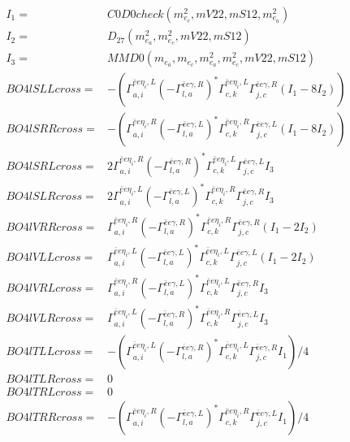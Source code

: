 \documentclass[A4,landscape]{article}
\begin{document}
\begin{align} 
I_1 = & C0D0check(m^2_{e_{{c}}}, mV22, mS12, m^2_{e_{{a}}}) \\ 
I_2 = & D_{27}(m^2_{e_{{a}}}, m^2_{e_{{c}}}, mV22, mS12) \\ 
I_3 = & MMD0(m_{e_{{a}}}, m_{e_{{c}}}, m^2_{e_{{a}}}, m^2_{e_{{c}}}, mV22, mS12) \\ 
  BO4lSLLcross= & -( \Gamma^{\bar{e}e \eta_i ,L}_{a, i} (- \Gamma^{\bar{e}e \gamma ,R} _{l, a})^* \Gamma^{\bar{e}e \eta_i ,L}_{c, k} \Gamma^{\bar{e}e \gamma ,R}_{j, c} (I_1 - 8 I_2)) \\ 
  BO4lSRRcross= & -( \Gamma^{\bar{e}e \eta_i ,R}_{a, i} (- \Gamma^{\bar{e}e \gamma ,L} _{l, a})^* \Gamma^{\bar{e}e \eta_i ,R}_{c, k} \Gamma^{\bar{e}e \gamma ,L}_{j, c} (I_1 - 8 I_2)) \\ 
  BO4lSRLcross= & 2  \Gamma^{\bar{e}e \eta_i ,R}_{a, i} (- \Gamma^{\bar{e}e \gamma ,R} _{l, a})^* \Gamma^{\bar{e}e \eta_i ,L}_{c, k} \Gamma^{\bar{e}e \gamma ,L}_{j, c} I_3 \\ 
  BO4lSLRcross= & 2  \Gamma^{\bar{e}e \eta_i ,L}_{a, i} (- \Gamma^{\bar{e}e \gamma ,L} _{l, a})^* \Gamma^{\bar{e}e \eta_i ,R}_{c, k} \Gamma^{\bar{e}e \gamma ,R}_{j, c} I_3 \\ 
  BO4lVRRcross= &  \Gamma^{\bar{e}e \eta_i ,R}_{a, i} (- \Gamma^{\bar{e}e \gamma ,R} _{l, a})^* \Gamma^{\bar{e}e \eta_i ,R}_{c, k} \Gamma^{\bar{e}e \gamma ,R}_{j, c} (I_1 - 2 I_2) \\ 
  BO4lVLLcross= &  \Gamma^{\bar{e}e \eta_i ,L}_{a, i} (- \Gamma^{\bar{e}e \gamma ,L} _{l, a})^* \Gamma^{\bar{e}e \eta_i ,L}_{c, k} \Gamma^{\bar{e}e \gamma ,L}_{j, c} (I_1 - 2 I_2) \\ 
  BO4lVRLcross= &  \Gamma^{\bar{e}e \eta_i ,R}_{a, i} (- \Gamma^{\bar{e}e \gamma ,L} _{l, a})^* \Gamma^{\bar{e}e \eta_i ,L}_{c, k} \Gamma^{\bar{e}e \gamma ,R}_{j, c} I_3 \\ 
  BO4lVLRcross= &  \Gamma^{\bar{e}e \eta_i ,L}_{a, i} (- \Gamma^{\bar{e}e \gamma ,R} _{l, a})^* \Gamma^{\bar{e}e \eta_i ,R}_{c, k} \Gamma^{\bar{e}e \gamma ,L}_{j, c} I_3 \\ 
  BO4lTLLcross= & -( \Gamma^{\bar{e}e \eta_i ,L}_{a, i} (- \Gamma^{\bar{e}e \gamma ,R} _{l, a})^* \Gamma^{\bar{e}e \eta_i ,L}_{c, k} \Gamma^{\bar{e}e \gamma ,R}_{j, c} I_1)/4 \\ 
  BO4lTLRcross= & 0 \\ 
  BO4lTRLcross= & 0 \\ 
  BO4lTRRcross= & -( \Gamma^{\bar{e}e \eta_i ,R}_{a, i} (- \Gamma^{\bar{e}e \gamma ,L} _{l, a})^* \Gamma^{\bar{e}e \eta_i ,R}_{c, k} \Gamma^{\bar{e}e \gamma ,L}_{j, c} I_1)/4 \\ 
\end{align} 
\end{document}
